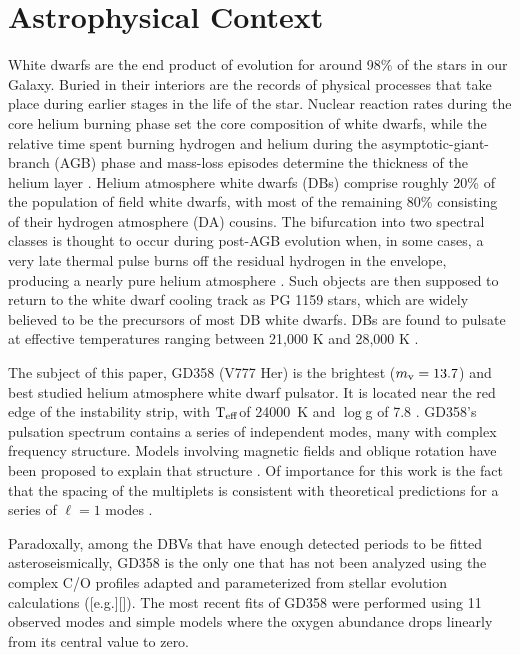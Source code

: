 \documentclass[12pt,preprint]{aastex}
\newcommand{\teff}{$\rm T_{eff}$}
\newcommand{\logg}{$\log$g }
\begin{document}

\section{Astrophysical Context}
White dwarfs are the end product of evolution for around 98\% of the stars in our Galaxy. 
Buried in their interiors are the records of physical processes that take place during 
earlier stages in the life of the star. Nuclear reaction rates during the core helium 
burning phase set the core composition of white dwarfs, while the relative time spent 
burning hydrogen and helium during the asymptotic-giant-branch (AGB) phase and mass-loss 
episodes determine the thickness of the helium layer \citep{Lawlor06,Althaus05}. Helium 
atmosphere white dwarfs (DBs) comprise roughly 20\% of the population of field white 
dwarfs, with most of the remaining 80\% consisting of their hydrogen atmosphere (DA) 
cousins. The bifurcation into two spectral classes is thought to occur during post-AGB 
evolution when, in some cases, a very late thermal pulse burns off the residual hydrogen 
in the envelope, producing a nearly pure helium atmosphere \citep{Iben83}. Such objects 
are then supposed to return to the white dwarf cooling track as PG 1159 stars, which are 
widely believed to be the precursors of most DB white dwarfs. DBs are found to pulsate at 
effective temperatures ranging between 21,000 K and 28,000 K \citep{Beauchamp99, Castanheira05}. 

The subject of this paper, GD358 (V777 Her) is the brightest ($m_{\rm v}=13.7$) and best 
studied helium atmosphere white dwarf pulsator. It is located near the red edge of the 
instability strip, with \teff of 24000~K and \logg of 7.8 \citep{Koester2013}. GD358's 
pulsation spectrum contains a series of independent modes, many with complex 
frequency structure.  Models involving magnetic fields and oblique rotation have been 
proposed to explain that structure \citep{Montgomery10}. Of importance for
this work is the fact that the spacing of the multiplets is consistent with theoretical 
predictions for a series of $\ell=1$ modes \citep{Provencal09}.

Paradoxally, among the DBVs that have enough detected periods to be fitted 
asteroseismically, GD358 is the only one that has not been analyzed using the complex 
C/O profiles adapted and parameterized from stellar evolution calculations
([e.g.][]\citet{Salaris97,Althaus05}). The most recent fits of GD358 \citep{Metcalfe03c} were 
performed using 11 observed modes and simple models where the oxygen abundance 
drops linearly from its central value to zero. 
\end{document}
